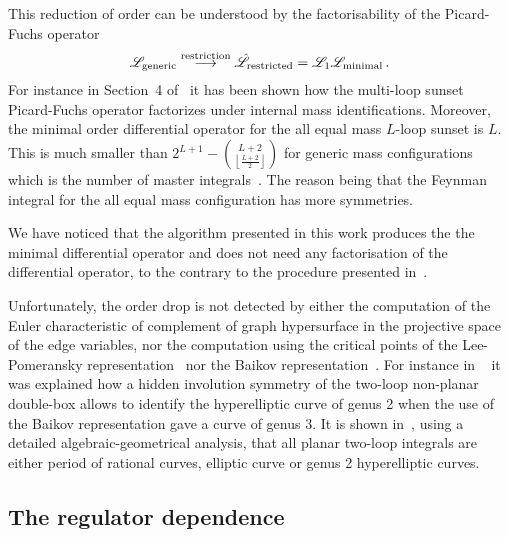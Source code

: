 \documentclass[a4paper,12pt]{article}
\newcommand\lNote[1]{
	\todo[backgroundcolor=red!20!white,fancyline,
	bordercolor=white]{ LDLC:  #1}}
\numberwithin{equation}{section}
\numberwithin{figure}{section}
\begin{document}
This reduction of order can be
understood by the factorisability of the Picard-Fuchs operator
\begin{equation}
  \mathscr{L}_{\rm generic} \stackrel{\rm restriction}{\longrightarrow}
  \hat{\mathscr{L}}_{\rm restricted}   = \mathscr{L}_1 \mathscr{L}_{\rm minimal} \,.
\end{equation}
For instance in Section~4 of~\cite{Lairez:2022zkj} it has been shown
how the multi-loop sunset Picard-Fuchs operator factorizes under
internal mass identifications. Moreover,
%
the minimal order differential operator for the all equal
mass $L$-loop sunset is $L$. This is much smaller than 
$2^{L+1}-\binom{L+2}{\left\lfloor \frac{L+2}{2}\right\rfloor }$ for generic
mass configurations~\cite{Lairez:2022zkj} which is the number of
master integrals~\cite{Bitoun:2017nre}.
The reason being that the Feynman integral for the all equal mass
configuration has more symmetries.  

We have noticed that the algorithm presented in this work produces the 
the minimal  differential operator and does not need any factorisation
of the differential operator, to the contrary to the procedure
presented in~\cite{Pogel:2022vat}. 
%
%

Unfortunately, the order drop is not detected by  either the
computation of the Euler characteristic of complement of graph
hypersurface in the projective space of the edge variables, nor the
computation using the critical points of the
Lee-Pomeransky representation~\cite{Lee:2013hzt}   nor the
Baikov
representation~\cite{Frellesvig:2017aai,Frellesvig:2019uqt,Cacciatori:2021nli}.
For instance in ~\cite{Marzucca:2023gto} it was explained how a hidden involution symmetry of the
two-loop non-planar double-box allows to identify the hyperelliptic
curve of genus 2 when the use of the Baikov representation gave a
curve of genus 3.
It is shown in~\cite{Doran:2023yzu}, using
a detailed  algebraic-geometrical analysis, that all planar two-loop
integrals are either period of rational curves, elliptic curve or genus
2 hyperelliptic curves. \lNote{also order drop?}

\subsection{The regulator dependence}
\label{sec:epsilon-dependence}
\end{document}
